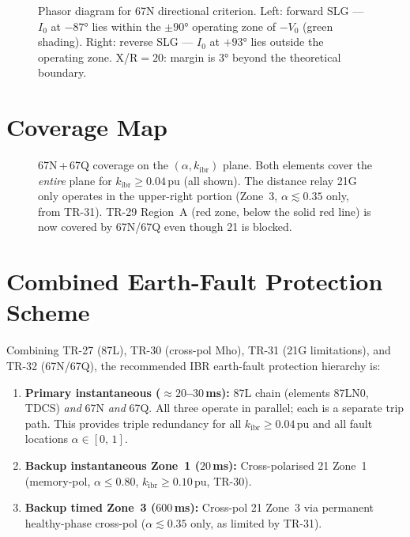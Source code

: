 \documentclass[11pt,a4paper]{article}
\begin{document}
\begin{figure}[h!]
\centering
\caption{%
  Phasor diagram for 67N directional criterion.  Left: forward SLG ---
  $I_0$ at $-87°$ lies within the $±90°$ operating zone of $-V_0$
  (green shading).  Right: reverse SLG --- $I_0$ at $+93°$ lies outside
  the operating zone.  X/R$=20$: margin is $3°$ beyond the theoretical boundary.}
\label{fig:phasor}

\end{figure}

\section{Coverage Map}
\label{sec:coverage}

\begin{figure}[h!]
\centering
\caption{%
  67N\,+\,67Q coverage on the $({\alpha}, k_\mathrm{ibr})$ plane.
  Both elements cover the \emph{entire} plane for $k_\mathrm{ibr} \geq 0.04$\,pu
  (all shown).  The distance relay 21G only operates in the upper-right portion
  (Zone~3, $\alpha \lesssim 0.35$ only, from TR-31).  TR-29 Region~A (red zone,
  below the solid red line) is now covered by 67N/67Q even though 21 is blocked.}
\label{fig:coverage}

\end{figure}

\section{Combined Earth-Fault Protection Scheme}
\label{sec:scheme}

Combining TR-27 (87L), TR-30 (cross-pol Mho), TR-31 (21G limitations), and
TR-32 (67N/67Q), the recommended IBR earth-fault protection hierarchy is:

\begin{enumerate}
  \item \textbf{Primary instantaneous ($\approx 20$--$30$\,ms):}
        87L chain (elements 87LN0, TDCS) \emph{and} 67N \emph{and} 67Q.
        All three operate in parallel; each is a separate trip path.
        This provides triple redundancy for all $k_\mathrm{ibr} \geq 0.04$\,pu
        and all fault locations $\alpha \in [0,\,1]$.
  \item \textbf{Backup instantaneous Zone~1 ($20$\,ms):}
        Cross-polarised 21 Zone~1 (memory-pol, $\alpha \leq 0.80$,
        $k_\mathrm{ibr} \geq 0.10$\,pu, TR-30).
  \item \textbf{Backup timed Zone~3 ($600$\,ms):}
        Cross-pol 21 Zone~3 via permanent healthy-phase cross-pol
        ($\alpha \lesssim 0.35$ only, as limited by TR-31).
\end{enumerate}
\end{document}
